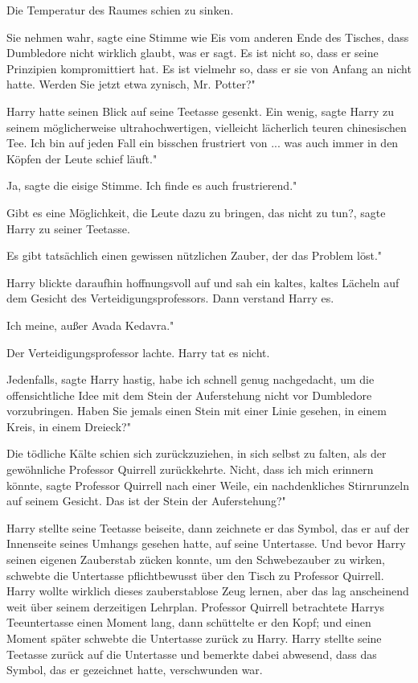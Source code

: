 Die Temperatur des Raumes schien zu sinken.

\glqq Sie nehmen wahr\grqq{}, sagte eine Stimme wie Eis vom anderen Ende des
Tisches, \glqq dass Dumbledore nicht wirklich glaubt, was er sagt. Es ist nicht
so, dass er seine Prinzipien kompromittiert hat. Es ist vielmehr so, dass er sie
von Anfang an nicht hatte. Werden Sie jetzt etwa zynisch, Mr. Potter?"

Harry hatte seinen Blick auf seine Teetasse gesenkt. \glqq Ein wenig\grqq{},
sagte Harry zu seinem möglicherweise ultrahochwertigen, vielleicht lächerlich
teuren chinesischen Tee. \glqq Ich bin auf jeden Fall ein bisschen frustriert
von ... was auch immer in den Köpfen der Leute schief läuft."

\glqq Ja\grqq{}, sagte die eisige Stimme. \glqq Ich finde es auch frustrierend."

\glqq Gibt es eine Möglichkeit, die Leute dazu zu bringen, das nicht zu
tun?\grqq{}, sagte Harry zu seiner Teetasse.

\glqq Es gibt tatsächlich einen gewissen nützlichen Zauber, der das Problem
löst."

Harry blickte daraufhin hoffnungsvoll auf und sah ein kaltes, kaltes Lächeln auf
dem Gesicht des Verteidigungsprofessors. Dann verstand Harry es.

\glqq Ich meine, außer Avada Kedavra."

Der Verteidigungsprofessor lachte. Harry tat es nicht.

\glqq Jedenfalls\grqq{}, sagte Harry hastig, \glqq habe ich schnell genug
nachgedacht, um die offensichtliche Idee mit dem Stein der Auferstehung nicht
vor Dumbledore vorzubringen. Haben Sie jemals einen Stein mit einer Linie
gesehen, in einem Kreis, in einem Dreieck?"

Die tödliche Kälte schien sich zurückzuziehen, in sich selbst zu falten, als der
gewöhnliche Professor Quirrell zurückkehrte. \glqq Nicht, dass ich mich erinnern
könnte\grqq{}, sagte Professor Quirrell nach einer Weile, ein nachdenkliches
Stirnrunzeln auf seinem Gesicht. \glqq Das ist der Stein der Auferstehung?"

Harry stellte seine Teetasse beiseite, dann zeichnete er das Symbol, das er auf
der Innenseite seines Umhangs gesehen hatte, auf seine Untertasse. Und bevor
Harry seinen eigenen Zauberstab zücken konnte, um den Schwebezauber zu wirken,
schwebte die Untertasse pflichtbewusst über den Tisch zu Professor Quirrell.
Harry wollte wirklich dieses zauberstablose Zeug lernen, aber das lag
anscheinend weit über seinem derzeitigen Lehrplan. Professor Quirrell
betrachtete Harrys Teeuntertasse einen Moment lang, dann schüttelte er den Kopf;
und einen Moment später schwebte die Untertasse zurück zu Harry. Harry stellte
seine Teetasse zurück auf die Untertasse und bemerkte dabei abwesend, dass das
Symbol, das er gezeichnet hatte, verschwunden war.

